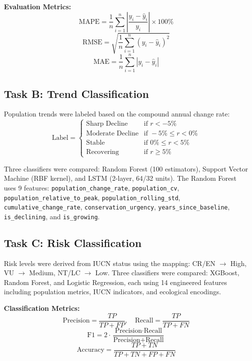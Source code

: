 \documentclass[conference]{IEEEtran}
\begin{document}
\textbf{Evaluation Metrics:}
\begin{equation}
\text{MAPE} = \frac{1}{n} \sum_{i=1}^{n} \left| \frac{y_i - \hat{y}_i}{y_i} \right| \times 100\%
\end{equation}
\begin{equation}
\text{RMSE} = \sqrt{\frac{1}{n} \sum_{i=1}^{n} (y_i - \hat{y}_i)^2}
\end{equation}
\begin{equation}
\text{MAE} = \frac{1}{n} \sum_{i=1}^{n} |y_i - \hat{y}_i|
\end{equation}

\subsection{Task B: Trend Classification}
Population trends were labeled based on the compound annual change rate:
\begin{equation}
\text{Label} = \begin{cases}
\text{Sharp Decline} & \text{if } r < -5\% \\
\text{Moderate Decline} & \text{if } -5\% \leq r < 0\% \\
\text{Stable} & \text{if } 0\% \leq r < 5\% \\
\text{Recovering} & \text{if } r \geq 5\%
\end{cases}
\end{equation}

Three classifiers were compared: Random Forest (100 estimators), Support Vector Machine (RBF kernel), and LSTM (2-layer, 64/32 units). The Random Forest uses 9 features: \texttt{population\_change\_rate}, \texttt{population\_cv}, \texttt{population\_relative\_to\_peak}, \texttt{population\_rolling\_std}, \texttt{cumulative\_change\_rate}, \texttt{conservation\_urgency}, \texttt{years\_since\_baseline}, \texttt{is\_declining}, and \texttt{is\_growing}.

\subsection{Task C: Risk Classification}
Risk levels were derived from IUCN status using the mapping: CR/EN $\rightarrow$ High, VU $\rightarrow$ Medium, NT/LC $\rightarrow$ Low. Three classifiers were compared: XGBoost, Random Forest, and Logistic Regression, each using 14 engineered features including population metrics, IUCN indicators, and ecological encodings.

\textbf{Classification Metrics:}
\begin{equation}
\text{Precision} = \frac{TP}{TP + FP}, \quad \text{Recall} = \frac{TP}{TP + FN}
\end{equation}
\begin{equation}
\text{F1} = 2 \cdot \frac{\text{Precision} \cdot \text{Recall}}{\text{Precision} + \text{Recall}}
\end{equation}
\begin{equation}
\text{Accuracy} = \frac{TP + TN}{TP + TN + FP + FN}
\end{equation}
\end{document}
